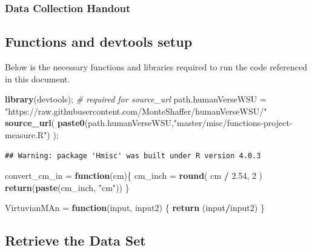 \documentclass[]{article}
\newenvironment{Shaded}{\begin{snugshade}}{\end{snugshade}}
\newcommand{\CommentTok}[1]{\textcolor[rgb]{0.56,0.35,0.01}{\textit{#1}}}
\newcommand{\ControlFlowTok}[1]{\textcolor[rgb]{0.13,0.29,0.53}{\textbf{#1}}}
\newcommand{\DecValTok}[1]{\textcolor[rgb]{0.00,0.00,0.81}{#1}}
\newcommand{\FloatTok}[1]{\textcolor[rgb]{0.00,0.00,0.81}{#1}}
\newcommand{\KeywordTok}[1]{\textcolor[rgb]{0.13,0.29,0.53}{\textbf{#1}}}
\newcommand{\NormalTok}[1]{#1}
\newcommand{\OperatorTok}[1]{\textcolor[rgb]{0.81,0.36,0.00}{\textbf{#1}}}
\newcommand{\StringTok}[1]{\textcolor[rgb]{0.31,0.60,0.02}{#1}}
\begin{document}
\subsubsection{Data Collection Handout}
\label{sec:Provenance- Data Collection Handout}

\subsection{Functions and devtools setup}

Below is the necessary functions and libraries required to run the code
referenced in this document.

\begin{Shaded}
\begin{Highlighting}[]
\KeywordTok{library}\NormalTok{(devtools);       }\CommentTok{\# required for source\_url}
\NormalTok{path.humanVerseWSU =}\StringTok{ "https://raw.githubusercontent.com/MonteShaffer/humanVerseWSU/"}
\KeywordTok{source\_url}\NormalTok{( }\KeywordTok{paste0}\NormalTok{(path.humanVerseWSU,}\StringTok{"master/misc/functions{-}project{-}measure.R"}\NormalTok{) );}
\end{Highlighting}
\end{Shaded}

\begin{verbatim}
## Warning: package 'Hmisc' was built under R version 4.0.3
\end{verbatim}

\begin{Shaded}
\begin{Highlighting}[]
\NormalTok{convert\_cm\_in =}\StringTok{ }\ControlFlowTok{function}\NormalTok{(cm)\{}
\NormalTok{  cm\_inch =}\StringTok{ }\KeywordTok{round}\NormalTok{( cm }\OperatorTok{/}\StringTok{ }\FloatTok{2.54}\NormalTok{, }\DecValTok{2}\NormalTok{ )}
  \KeywordTok{return}\NormalTok{(}\KeywordTok{paste}\NormalTok{(cm\_inch, }\StringTok{"cm"}\NormalTok{))}
\NormalTok{\}}


\NormalTok{VirtuvianMAn =}\StringTok{ }\ControlFlowTok{function}\NormalTok{(input, input2)}
\NormalTok{  \{}
    \KeywordTok{return}\NormalTok{ (input}\OperatorTok{/}\NormalTok{input2)}
\NormalTok{  \}}
\end{Highlighting}
\end{Shaded}

\subsection{Retrieve the Data Set}
\end{document}
